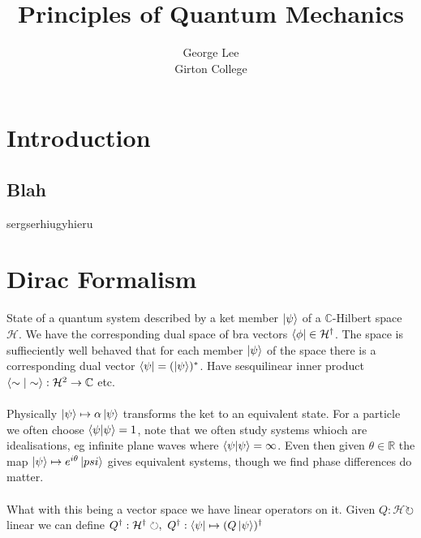 \documentclass{article}
\title{Principles of Quantum Mechanics}
\author{George Lee\\Girton College}
\begin{document}
\maketitle
\section{Introduction}
\subsection{Blah}
sergserhiugyhieru
\section{Dirac Formalism}
State of a quantum system described by a ket member $\ket{\psi}$ of a $\mathbb{C}$-Hilbert space $\mathcal{H}$.  We have the corresponding dual space of bra vectors $\bra{\phi}\in\mathcal{H}^\dagger$.  The space is suffieciently well behaved that for each member $\ket{\psi}$ of the space there is a corresponding dual vector $\bra{\psi}=(\ket{\psi})^*$.  Have sesquilinear inner product $\braket{\sim|\sim}:\mathcal{H}^2\rightarrow\mathbb{C}$ etc.
\\
\\
Physically $\ket{\psi}\mapsto\alpha\ket{\psi}$ transforms the ket to an equivalent state.  For a particle we often choose $\braket{\psi|\psi}=1$, note that we often study systems whioch are idealisations, eg infinite plane waves where $\braket{\psi|\psi}=\infty$.  Even then given $\theta\in\mathbb{R}$ the map $\ket{\psi}\mapsto e^{i\theta}\ket{psi}$ gives equivalent systems, though we find phase differences do matter.
\\
\\
What with this being a vector space we have linear operators on it.  Given $Q:\mathcal{H}\circlearrowright$ linear we can define $Q^\dagger:\mathcal{H}^\dagger\circlearrowright,~Q^\dagger:\bra{\psi}\mapsto(Q\ket{\psi})^\dagger$
\end{document}
